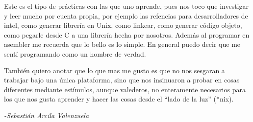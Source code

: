 
Este es el tipo de prácticas con las que uno aprende, pues nos toco que investigar y leer mucho por cuenta propia, por ejemplo las refencias para desarrolladores de intel, como generar librería en Unix, como linkear, como generar código objeto, como pegarle desde C a una librería hecha por nosotros. Además al programar en asembler me recuerda que lo bello es lo simple. En general puedo decir que me sentí programando como un hombre de verdad.

También quiero anotar que lo que mas me gusto es que no nos sesgaran a trabajar bajo una única plataforma, sino que nos insinuaron a probar en cosas diferentes mediante estímulos, aunque valederos, no enteramente necesarios para los que nos gusta aprender y hacer las cosas desde el ``lado de la luz'' (*nix).

\begin{flushright} 
	\itshape{-Sebastián Arcila Valenzuela}
\end{flushright}

%
